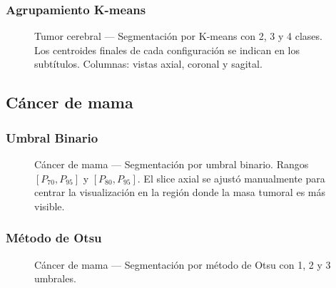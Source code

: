 \documentclass[12pt, a4paper]{article}
\begin{document}
\subsubsection{Agrupamiento K-means}

\begin{figure}[H]
  \centering
  \caption{Tumor cerebral — Segmentación por K-means con 2, 3 y 4 clases.
    Los centroides finales de cada configuración se indican en los subtítulos.
    Columnas: vistas axial, coronal y sagital.}
  \label{fig:brain_kmeans}
\end{figure}

\subsection{Cáncer de mama}

\subsubsection{Umbral Binario}

\begin{figure}[H]
  \centering
  \caption{Cáncer de mama — Segmentación por umbral binario. Rangos $[P_{70}, P_{95}]$
    y $[P_{80}, P_{95}]$. El slice axial se ajustó manualmente para centrar la
    visualización en la región donde la masa tumoral es más visible.}
  \label{fig:breast_binary}
\end{figure}

\subsubsection{Método de Otsu}

\begin{figure}[H]
  \centering
  \caption{Cáncer de mama — Segmentación por método de Otsu con 1, 2 y 3 umbrales.}
  \label{fig:breast_otsu}
\end{figure}
\end{document}
